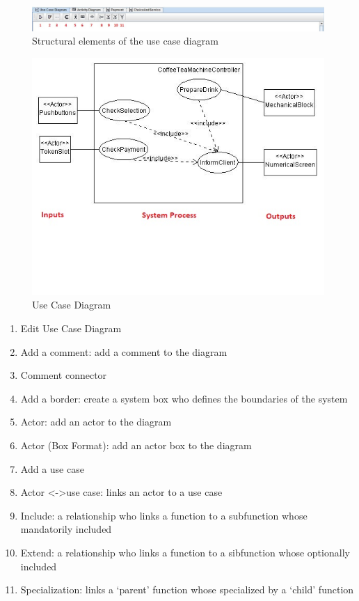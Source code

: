 \documentclass[12pt]{article}
\begin{document}
\begin{figure}[htbp]
\centering
\includegraphics[width=0.99\textwidth]{fig/structusecase.jpg}
\caption{Structural elements of the use case diagram} \label{fig:structusecase}
\end{figure}

\begin{figure}[htbp]
\centering
\includegraphics[width=0.99\textwidth]{fig/usecase.jpg}
\caption{Use Case Diagram} \label{fig:usecase}
\end{figure}



\begin{enumerate}
\item Edit Use Case Diagram
\item Add a comment: add a comment to the diagram
\item Comment connector
\item Add a border: create a system box who defines the boundaries of the system
\item Actor: add an actor to the diagram
\item Actor (Box Format): add an actor box to the diagram
\item Add a use case
\item Actor <->use case: links an actor to a use case
\item Include: a relationship who links a function to a subfunction whose mandatorily included
\item Extend: a relationship who links a function to a sibfunction whose optionally included
\item Specialization: links a `parent' function whose specialized by a `child' function
\end{enumerate}
\end{document}
